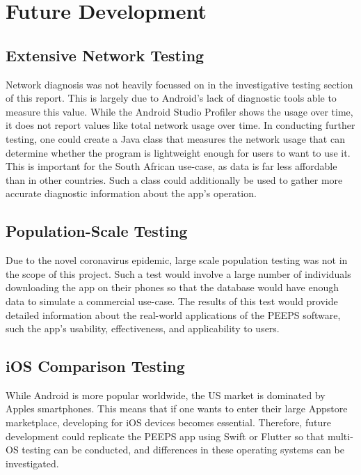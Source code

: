 \section{Future Development}

\subsection{Extensive Network Testing}
Network diagnosis was not heavily focussed on in the investigative testing section of this report. This is largely due to Android's lack of diagnostic tools able to measure this value. While the Android Studio Profiler shows the usage over time, it does not report values like total network usage over time. In conducting further testing, one could create a Java class that measures the network usage that can determine whether the program is lightweight enough for users to want to use it. This is important for the South African use-case, as data is far less affordable than in other countries. Such a class could additionally be used to gather more accurate diagnostic information about the app's operation.

\subsection{Population-Scale Testing}
Due to the novel coronavirus epidemic, large scale population testing was not in the scope of this project. Such a test would involve a large number of individuals downloading the app on their phones so that the database would have enough data to simulate a commercial use-case. The results of this test would provide detailed information about the real-world applications of the PEEPS software, such the app's usability, effectiveness, and applicability to users.

\subsection{iOS Comparison Testing}
While Android is more popular worldwide, the US market is dominated by Apples smartphones. This means that if one wants to enter their large Appstore marketplace, developing for iOS devices becomes essential. Therefore, future development could replicate the PEEPS app using Swift or Flutter so that multi-OS testing can be conducted, and differences in these operating systems can be investigated.
